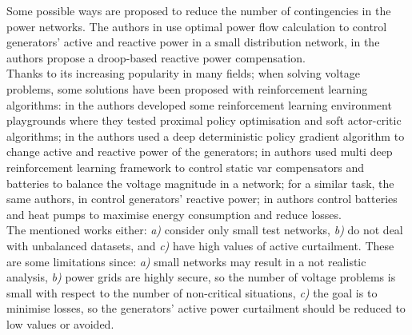 Some possible ways are proposed to reduce the number of contingencies in the power networks. The authors in \cite{lr_copf} use optimal power flow calculation to control generators' active and reactive power in a small distribution network, in \cite{lr_cdb} the authors propose a droop-based reactive power compensation.\\ Thanks to its increasing popularity in many fields; when solving voltage problems, some solutions have been proposed with reinforcement learning algorithms: in \cite{gym-anm} the authors developed some reinforcement learning environment playgrounds where they tested proximal policy optimisation and soft actor-critic algorithms; in \cite{lr_csi} the authors used a deep deterministic policy gradient algorithm to change active and reactive power of the generators; in \cite{lr_cmadarl} authors used multi deep reinforcement learning framework to control static var compensators and batteries to balance the voltage magnitude in a network; for a similar task, the same authors, in \cite{lr_cfiq} control generators' reactive power; in \cite{lr_fremi} authors control batteries and heat pumps to maximise energy consumption and reduce losses.\\
The mentioned works either: \emph{a)} consider only small test networks, \emph{b)} do not deal with unbalanced datasets, and \emph{c)} have high values of active curtailment. These are some limitations since: \emph{a)} small networks may result in a not realistic analysis, \emph{b)} power grids are highly secure, so the number of voltage problems is small with respect to the number of non-critical situations, \emph{c)} the goal is to minimise losses, so the generators' active power curtailment should be reduced to low values or avoided.
